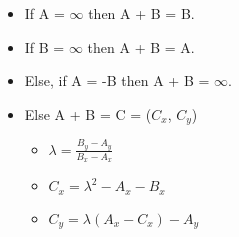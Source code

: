 \begin{itemize}
    \item[] If A = $\infty$ then A + B = B.
    \item[] If B = $\infty$ then A + B = A.
    \item[] Else, if A = -B then A + B = $\infty$.
    \item[] Else A + B = C = ($C_x$, $C_y$)
    \begin{itemize}
        \item[] $\lambda = \frac{B_y - A_y} {B_x - A_x}$
        \item[] $C_x = \lambda^2 - A_x - B_x$
        \item[] $C_y = \lambda(A_x - C_x) - A_y$
    \end{itemize}
\end{itemize}

